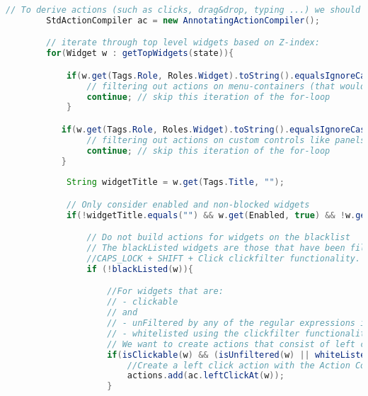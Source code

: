 \begin{lstlisting}[language=java, basicstyle=\tiny, caption=Protocol for the real world application, label=code:real-world-app-protocol]
        // To derive actions (such as clicks, drag&drop, typing ...) we should first create an action compiler.
        StdActionCompiler ac = new AnnotatingActionCompiler();

        // iterate through top level widgets based on Z-index:
        for(Widget w : getTopWidgets(state)){

            if(w.get(Tags.Role, Roles.Widget).toString().equalsIgnoreCase("UIAMenu")){
                // filtering out actions on menu-containers (that would add an action in the middle of the menu)
                continue; // skip this iteration of the for-loop
            }

           if(w.get(Tags.Role, Roles.Widget).toString().equalsIgnoreCase("UIACustomControl")){
                // filtering out actions on custom controls like panels
                continue; // skip this iteration of the for-loop
           }
            
            String widgetTitle = w.get(Tags.Title, "");

            // Only consider enabled and non-blocked widgets
            if(!widgetTitle.equals("") && w.get(Enabled, true) && !w.get(Blocked, false)){

                // Do not build actions for widgets on the blacklist
                // The blackListed widgets are those that have been filtered during the SPY mode with the
                //CAPS_LOCK + SHIFT + Click clickfilter functionality.
                if (!blackListed(w)){

                    //For widgets that are:
                    // - clickable
                    // and
                    // - unFiltered by any of the regular expressions in the Filter-tab, or
                    // - whitelisted using the clickfilter functionality in SPY mode (CAPS_LOCK + SHIFT + CNTR + Click)
                    // We want to create actions that consist of left clicking on them
                    if(isClickable(w) && (isUnfiltered(w) || whiteListed(w))) {
                        //Create a left click action with the Action Compiler, and add it to the set of derived actions
                        actions.add(ac.leftClickAt(w));
                    }


\end{lstlisting}
